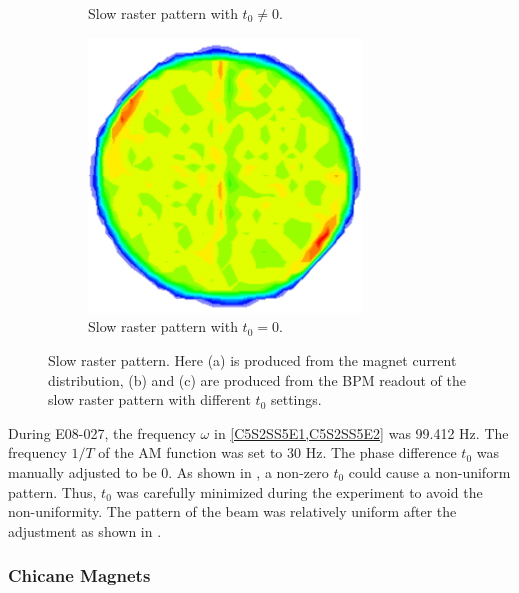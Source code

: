 \begin{figure}[tb!]
\begin{subfigure}[t]{0.25\textwidth}
    \caption{Slow raster pattern with $t_0\neq0$. \label{C5S2SS5F2b}}
  \end{subfigure}
  \qquad
  \begin{subfigure}[t]{0.25\textwidth}
    \centering
    \includegraphics[width=0.8\textwidth]{figs/slow-raster-pattern-data-good.png}
    \caption{Slow raster pattern with $t_0=0$. \label{C5S2SS5F2c}}
  \end{subfigure}
  \caption[Slow raster pattern.]{Slow raster pattern. Here (a) is produced from the magnet current distribution, (b) and (c) are produced from the BPM readout of the slow raster pattern with different $t_0$ settings. \label{C5S2SS5F2}}
\end{figure}

During E08-027, the frequency $\omega$ in \cref{C5S2SS5E1,C5S2SS5E2} was 99.412 Hz. The frequency $1/T$ of the AM function was set to 30 Hz. The phase difference $t_0$ was manually adjusted to be 0. As shown in , a non-zero $t_0$ could cause a non-uniform pattern. Thus, $t_0$ was carefully minimized during the experiment to avoid the non-uniformity. The pattern of the beam was relatively uniform after the adjustment as shown in .

\subsubsection{Chicane Magnets}

